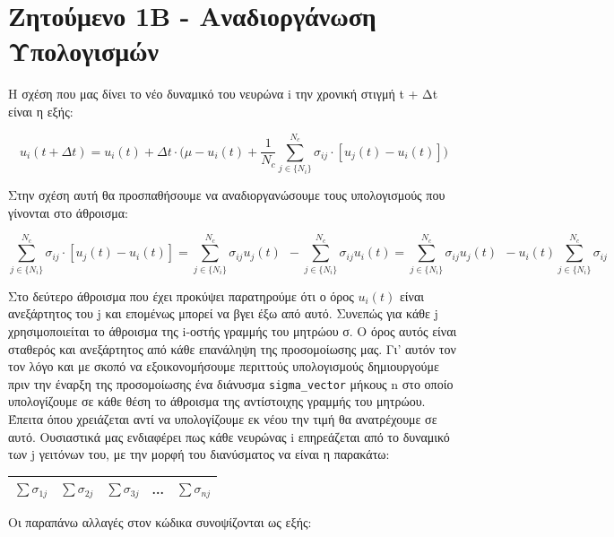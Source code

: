 \documentclass[a4paper,oneside,titlepage,10pt]{article}
\begin{document}
\newpage

\section*{Ζητούμενο 1B - Αναδιοργάνωση Υπολογισμών }

\noindent Η σχέση που μας δίνει το νέο δυναμικό του νευρώνα i την χρονική στιγμή t + Δt είναι η εξής:

$$
u_{i}(t+\Delta t) = u_{i}(t) + \Delta t \cdot \Bigg(\mu - u_{i}(t) + \frac{1}{N_{c}} \sum_{j \in \{N_{i}\}}^{N_{c}}\sigma_{ij} \cdot [u_{j}(t) - u_{i}(t)]\Bigg)
$$

\noindent Στην σχέση αυτή θα προσπαθήσουμε να αναδιοργανώσουμε τους υπολογισμούς που γίνονται στο άθροισμα:

$$
\sum_{j \in \{N_{i}\}}^{N_{c}}\sigma_{ij} \cdot [u_{j}(t) - u_{i}(t)] =
\sum_{j \in \{N_{i}\}}^{N_{c}}\sigma_{ij} u_{j}(t)\ \    - \sum_{j \in \{N_{i}\}}^{N_{c}}\sigma_{ij} u_{i}(t) = 
\sum_{j \in \{N_{i}\}}^{N_{c}}\sigma_{ij} u_{j}(t)\ \    - u_{i}(t)\sum_{j \in \{N_{i}\}}^{N_{c}}\sigma_{ij} 
$$

\noindent Στο δεύτερο άθροισμα που έχει προκύψει παρατηρούμε ότι ο όρος $u_{i}(t)$ είναι ανεξάρτητος του j και επομένως μπορεί να βγει έξω από αυτό. Συνεπώς για κάθε j χρησιμοποιείται το άθροισμα της i-οστής γραμμής του μητρώου σ. Ο όρος αυτός είναι σταθερός και ανεξάρτητος από κάθε επανάληψη της προσομοίωσης μας. Γι' αυτόν τον τον λόγο και με σκοπό να εξοικονομήσουμε περιττούς υπολογισμούς δημιουργούμε πριν την έναρξη της προσομοίωσης ένα διάνυσμα \texttt{sigma\_vector} μήκους n στο οποίο υπολογίζουμε σε κάθε θέση το άθροισμα της αντίστοιχης γραμμής του μητρώου. Έπειτα όπου χρειάζεται αντί να υπολογίζουμε εκ νέου την τιμή θα ανατρέχουμε σε αυτό. Ουσιαστικά μας ενδιαφέρει πως κάθε νευρώνας i επηρεάζεται από το δυναμικό των j γειτόνων του, με την μορφή του διανύσματος να είναι η παρακάτω: 

\begin{table}[!h]
	\centering
	\begin{tabular}{|l|l|l|l|l|}
		\hline
		$\sum \sigma_{1j}$ & $\sum \sigma_{2j}$ & $\sum \sigma_{3j}$ & ... & $\sum \sigma_{nj}$ \\ \hline
	\end{tabular}
\end{table}

\noindent Οι παραπάνω αλλαγές στον κώδικα συνοψίζονται ως εξής:


\end{document}

